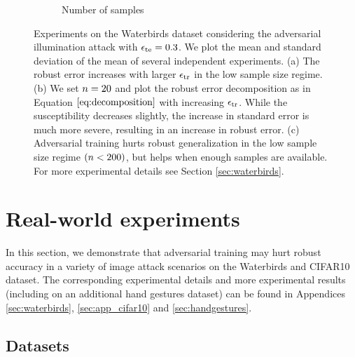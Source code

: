 \begin{figure}[!t]
\begin{subfigure}[b]{0.33\textwidth}
  \caption{Number of samples}
  \label{fig:waterbirds_light_numobs}
\end{subfigure}
  \caption{Experiments on the Waterbirds dataset considering the adversarial illumination attack with $\epsilon_{\text{te}} = 0.3$. We plot the mean and standard deviation of the mean of several independent experiments. (a) The robust error increases with larger $\epsilon_{\text{tr}}$ in the low sample size regime. (b) We set $n=20$ and plot the robust error decomposition as in Equation $\eqref{eq:decomposition}$ with increasing $\epsilon_{\text{tr}}$. While the susceptibility decreases slightly, the increase in standard error is much more severe, resulting in an increase in robust error. (c) Adversarial training hurts robust generalization in the low sample size regime $(n < 200)$, but helps when enough samples are available. For more experimental details see Section \ref{sec:waterbirds}.}
\label{fig:waterbirds_light}
\end{figure}

\section{Real-world experiments}
\label{sec:realworldexpapp}

In this section, we demonstrate that adversarial training may
hurt robust accuracy in a variety of image attack scenarios
on the Waterbirds and CIFAR10 dataset.
The corresponding experimental details and more experimental results (including
on an additional hand gestures dataset) can be found in Appendices
 \ref{sec:waterbirds}, \ref{sec:app_cifar10} and \ref{sec:handgestures}.


\subsection{Datasets}

